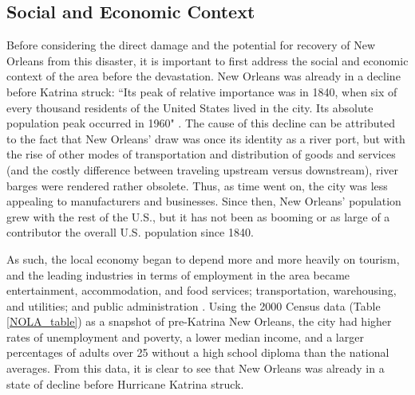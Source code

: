 \documentclass[%
 reprint,
 amsmath,amssymb,
 aps,
]{revtex4-1}
\begin{document}
\subsection{\label{sec:level2} Social and Economic Context}

Before considering the direct damage and the potential for recovery of New Orleans from this disaster, it is important to first address the social and economic context of the area before the devastation. New Orleans was already in a decline before Katrina struck:  ``Its peak of relative importance was in 1840, when six of every thousand residents of the United States lived in the city. Its absolute population peak occurred in 1960" \cite{VigdorPaper}. The cause of this decline can be attributed to the fact that New Orleans' draw was once its identity as a river port, but with the rise of other modes of transportation and distribution of goods and services (and the costly difference between traveling upstream versus downstream), river barges were rendered rather obsolete. Thus, as time went on, the city was less appealing to manufacturers and businesses. Since then, New Orleans' population grew with the rest of the U.S., but it has not been as booming or as large of a contributor the overall U.S. population since 1840. \cite{VigdorPaper}

As such, the local economy began to depend more and more heavily on tourism, and the leading industries in terms of employment in the area became entertainment, accommodation, and food services; transportation, warehousing, and utilities; and public administration \cite{VigdorPaper}. Using the 2000 Census data (Table \ref{NOLA_table}) as a snapshot of pre-Katrina New Orleans, the city had higher rates of unemployment and poverty, a lower median income, and a larger percentages of adults over 25 without a high school diploma than the national averages. From this data, it is clear to see that New Orleans was already in a state of decline before Hurricane Katrina struck.
\end{document}
